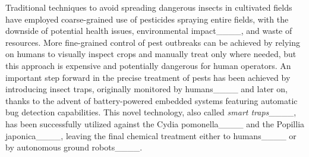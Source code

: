 
Traditional techniques to avoid spreading dangerous insects in cultivated fields have employed coarse-grained use of pesticides spraying entire fields, with the downside of potential health issues, environmental impact____, and waste of resources.
More fine-grained control of pest outbreaks can be achieved by relying on humans to visually inspect crops and manually treat only where needed, but this approach is expensive and potentially dangerous for human operators.
An important step forward in the precise treatment of pests has been achieved by introducing insect traps, originally monitored by humans____ and later on, thanks to the advent of battery-powered embedded systems featuring automatic bug detection capabilities.
This novel technology, also called \textit{smart traps}____, has been successfully utilized against the Cydia pomonella____ and the Popillia japonica____, leaving the final chemical treatment either to humans____ or by autonomous ground robots____.

